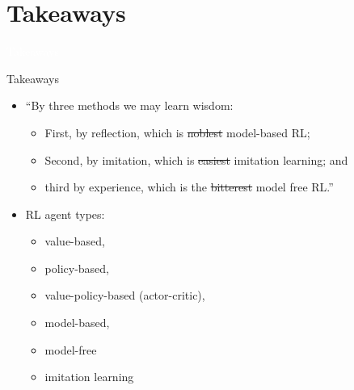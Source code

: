 \documentclass[11pt,table]{beamer}
\begin{document}
\section{Takeaways}
{
\begin{frame}
\centering
\Huge
\textcolor{white}{Takeaways}
\thispagestyle{empty}
\end{frame}
}



\begin{frame}{Takeaways}
\begin{itemize}
\item ``By three methods we may learn wisdom:
\begin{itemize}
	\item  First, by reflection, which is \sout{noblest} model-based RL;
	\item Second, by imitation, which is \sout{easiest} imitation learning; and
	\item third by experience, which is the \sout{bitterest} model free RL.''
\end{itemize}
\vspace{2em}
   \item RL agent types:
	 \begin{itemize}
		 \item value-based,
		 \item policy-based,
		 \item value-policy-based (actor-critic),
		 \item model-based,
	   \item model-free
	   \item imitation learning
	 \end{itemize}

\end{itemize}
\end{frame}
\end{document}
